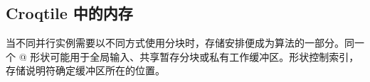 \subsection*{Croqtile 中的内存}

当不同并行实例需要以不同方式使用分块时，存储安排便成为算法的一部分。同一个 \co@[M, N]@ 形状可能用于全局输入、共享暂存分块或私有工作缓冲区。形状控制索引，存储说明符确定缓冲区所在的位置。
